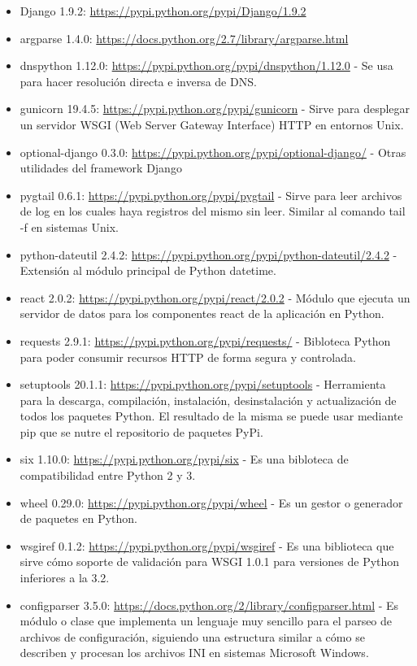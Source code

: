\begin{itemize}
  \item Django 1.9.2: \url{https://pypi.python.org/pypi/Django/1.9.2}
  \item argparse 1.4.0: \url{https://docs.python.org/2.7/library/argparse.html}
  \item dnspython 1.12.0: \url{https://pypi.python.org/pypi/dnspython/1.12.0} - Se usa para hacer resolución directa e inversa de DNS.
  \item gunicorn 19.4.5: \url{https://pypi.python.org/pypi/gunicorn} - Sirve para desplegar un servidor WSGI (Web Server Gateway Interface) HTTP en entornos Unix.
  \item optional-django 0.3.0: \url{https://pypi.python.org/pypi/optional-django/} - Otras utilidades del framework Django
  \item pygtail 0.6.1: \url{https://pypi.python.org/pypi/pygtail} - Sirve para leer archivos de log en los cuales haya registros del mismo sin leer. Similar al comando tail -f en sistemas Unix.
  \item python-dateutil 2.4.2: \url{https://pypi.python.org/pypi/python-dateutil/2.4.2} - Extensión al módulo principal de Python datetime.
  \item react 2.0.2: \url{https://pypi.python.org/pypi/react/2.0.2} - Módulo que ejecuta un servidor de datos para los componentes react de la aplicación en Python.
  \item requests 2.9.1: \url{https://pypi.python.org/pypi/requests/} - Bibloteca Python para poder consumir recursos HTTP de forma segura y controlada.
  \item setuptools 20.1.1: \url{https://pypi.python.org/pypi/setuptools} - Herramienta para la descarga, compilación, instalación, desinstalación y actualización de todos los paquetes Python. El resultado de la misma se puede usar mediante pip que se nutre el repositorio de paquetes PyPi.
  \item six 1.10.0: \url{https://pypi.python.org/pypi/six} - Es una bibloteca de compatibilidad entre Python 2 y 3.
  \item wheel 0.29.0: \url{https://pypi.python.org/pypi/wheel} - Es un gestor o generador de paquetes en Python.
  \item wsgiref 0.1.2: \url{https://pypi.python.org/pypi/wsgiref} - Es una biblioteca que sirve cómo soporte de validación para WSGI 1.0.1 para versiones de Python inferiores a la 3.2.
  \item configparser 3.5.0: \url{https://docs.python.org/2/library/configparser.html} - Es módulo o clase que implementa un lenguaje muy sencillo para el parseo de archivos de configuración, siguiendo una estructura similar a cómo se describen y procesan los archivos INI en sistemas Microsoft Windows.
\end{itemize}
